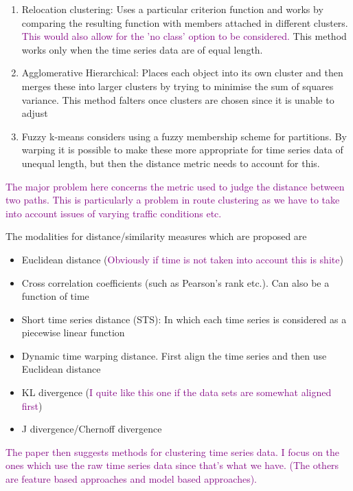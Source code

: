 \documentclass{article}
\newcommand\NOTE[1]{\textcolor{purple}{#1}}
\begin{document}
    \begin{enumerate}
        \item Relocation clustering: Uses a particular criterion function and works by comparing the resulting function with members attached in different clusters. \NOTE{This would also allow for the 'no class' option to be considered.} This method works only when the time series data are of equal length.
        \item Agglomerative Hierarchical: Places each object into its own cluster and then merges these into larger clusters by trying to minimise the sum of squares variance. This method falters once clusters are chosen since it is unable to adjust
        \item Fuzzy k-means considers using a fuzzy membership scheme for partitions. By warping it is possible to make these more appropriate for time series data of unequal length, but then the distance metric needs to account for this.
    \end{enumerate}

    \NOTE{The major problem here concerns the metric used to judge the distance between two paths. This is particularly a problem in route clustering as we have to take into account issues of varying traffic conditions etc.}

    The modalities for distance/similarity measures which are proposed are

    \begin{itemize}
        \item Euclidean distance (\NOTE{Obviously if time is not taken into account this is shite})
        \item Cross correlation coefficients (such as Pearson's rank etc.). Can also be a function of time
        \item Short time series distance (STS): In which each time series is considered as a piecewise linear function
        \item Dynamic time warping distance. First align the time series and then use Euclidean distance
        \item KL divergence (\NOTE{I quite like this one if the data sets are somewhat aligned first})
        \item J divergence/Chernoff divergence
    \end{itemize}

    \NOTE{The paper then suggests methods for clustering time series data. I focus on the ones which use the raw time series data since that's what we have. (The others are feature based approaches and model based approaches).}
\end{document}
